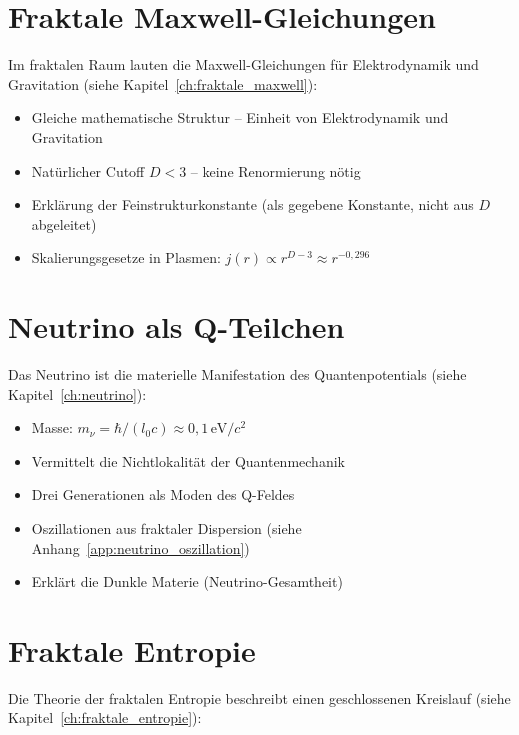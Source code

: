 \section{Fraktale Maxwell-Gleichungen}
\label{sec:fraktale_maxwell_zf}

Im fraktalen Raum lauten die Maxwell-Gleichungen für Elektrodynamik und Gravitation (siehe Kapitel~\ref{ch:fraktale_maxwell}):

\begin{itemize}
    \item Gleiche mathematische Struktur – Einheit von Elektrodynamik und Gravitation
    \item Natürlicher Cutoff \( D < 3 \) – keine Renormierung nötig
    \item Erklärung der Feinstrukturkonstante (als gegebene Konstante, nicht aus \( D \) abgeleitet)
    \item Skalierungsgesetze in Plasmen: \( j(r) \propto r^{D-3} \approx r^{-0,296} \)
\end{itemize}

\section{Neutrino als Q-Teilchen}
\label{sec:neutrino_zf}

Das Neutrino ist die materielle Manifestation des Quantenpotentials (siehe Kapitel~\ref{ch:neutrino}):

\begin{itemize}
    \item Masse: \( m_\nu = \hbar/(l_0 c) \approx 0,1 \, \text{eV}/c^2 \)
    \item Vermittelt die Nichtlokalität der Quantenmechanik
    \item Drei Generationen als Moden des Q-Feldes
    \item Oszillationen aus fraktaler Dispersion (siehe Anhang~\ref{app:neutrino_oszillation})
    \item Erklärt die Dunkle Materie (Neutrino-Gesamtheit)
\end{itemize}

\section{Fraktale Entropie}
\label{sec:entropie_zf}

Die Theorie der fraktalen Entropie beschreibt einen geschlossenen Kreislauf (siehe Kapitel~\ref{ch:fraktale_entropie}):

